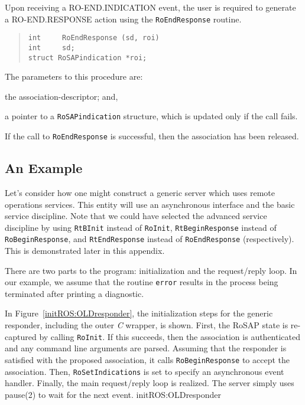 Upon receiving a {\sf RO-END.INDICATION\/} event,
the user is required to generate a {\sf RO-END.RESPONSE\/} action
using the \verb"RoEndResponse" routine.
\begin{quote}\small\begin{verbatim}
int     RoEndResponse (sd, roi)
int     sd;
struct RoSAPindication *roi;
\end{verbatim}\end{quote}
The parameters to this procedure are:
\begin{describe}
\item[\verb"sd":] the association-descriptor;
and,

\item[\verb"roi":] a pointer to a \verb"RoSAPindication" structure, which is
updated only if the call fails.
\end{describe}
If the call to \verb"RoEndResponse" is successful,
then the association has been released.

\subsection	{An Example}
Let's consider how one might construct a generic server which uses remote
operations services.
This entity will use an asynchronous interface and the basic service
discipline.
Note that we could have selected the advanced service discipline by using
\verb"RtBInit" instead of \verb"RoInit",
\verb"RtBeginResponse" instead of \verb"RoBeginResponse",
and
\verb"RtEndResponse" instead of \verb"RoEndResponse" (respectively).
This is demonstrated later in this appendix.

There are two parts to the program:
initialization and the request/reply loop.
In our example,
we assume that the routine \verb"error" results in the process being
terminated after printing a diagnostic.

In Figure~\ref{initROS:OLDresponder},
the initialization steps for the generic responder,
including the outer {\em C\/} wrapper,
is shown.
First, the RoSAP state is re-captured by calling \verb"RoInit".
If this succeeds,
then the association is authenticated and any command line arguments
are parsed.
Assuming that the responder is satisfied with the proposed association,
it calls \verb"RoBeginResponse" to accept the association.
Then,
\verb"RoSetIndications" is set to specify an asynchronous event handler.
Finally,
the main request/reply loop is realized.
The server simply uses \man pause(2) to wait for the next event.
{\let\small=\scriptsize			%
%
	{initROS:OLDresponder}}

